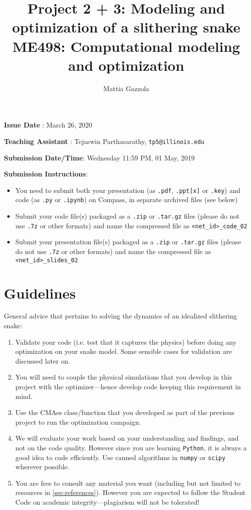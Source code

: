 \documentclass[11pt]{article}
\author{Mattia Gazzola}
\date{}
\title{Project 2 + 3: Modeling and optimization of a slithering snake\\\medskip
\large ME498: Computational modeling and optimization}
\begin{document}
\maketitle
\textbf{Issue Date} : March 26, 2020

\textbf{Teaching Assistant} : Tejaswin Parthasarathy, \texttt{tp5@illinois.edu}

\textbf{Submission Date/Time}: Wednesday 11:59 PM, 01 May, 2019

\textbf{Submission Instructions}:
\begin{itemize}
\item You need to submit both your presentation (as \texttt{.pdf}, \texttt{.ppt[x]} or \texttt{.key}) and code
(as \texttt{.py} or \texttt{.ipynb}) on Compass, in separate archived files (see below)
\item Submit your code file(s) packaged as a \texttt{.zip} or \texttt{.tar.gz} files (please do not use
\texttt{.7z} or other formats) and name the compressed file as \texttt{<net\_id>\_code\_02}
\item Submit your presentation file(s) packaged as a \texttt{.zip} or \texttt{.tar.gz} files (please do not use
\texttt{.7z} or other formats) and name the compressed file as \texttt{<net\_id>\_slides\_02}
\end{itemize}

\newpage

\section{Guidelines}
\label{sec:orgf8158c5}
General advice that pertains to solving the dynamics of an idealized
slithering snake:
\begin{enumerate}
\item Validate your code (i.e. test that it captures the physics) before doing
any optimization on your snake model. Some sensible cases for validation are
discussed later on.
\item You will need to couple the physical simulations that you develop in this
project with the optimizer---hence develop code keeping this requirement in mind.
\item Use the CMAes class/function that you developed as part of the previous
project to run the optimization campaign.
\item We will evaluate your work based on your understanding and findings, and
not on the code quality. However since you are learning \texttt{Python}, it is
always a good idea to code efficiently. Use canned algorithms in \texttt{numpy} or
\texttt{scipy} wherever possible.
\item You are free to consult any material you want (including but not limited to
resources in \cref{sec:references}). However you are expected to follow the
Student Code on academic integrity---plagiarism will not be tolerated!
\end{enumerate}
\end{document}

